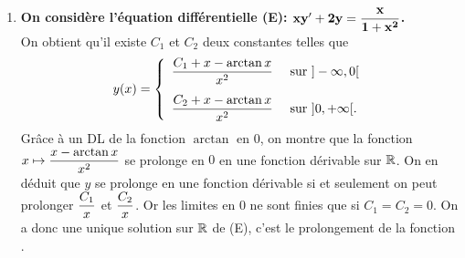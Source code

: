 \documentclass[a4paper, 11pt,reqno]{article}
\begin{document}
\begin{correction}
\begin{enumerate}
\item \textbf{On consid\`ere l'\'equation diff\'erentielle (E): $\mathbf{xy^{\prime}+2y=\displaystyle\frac{x}{1+x^2}}$.} \\
On obtient qu'il existe $C_1$ et $C_2$ deux constantes telles que
$$y(x) = \left\{ \begin{array}{rl}
\ddp \frac{C_1+x-\arctan x}{x^2} & \textmd{ sur } ]-\infty,0[\vsec\\
\ddp \frac{C_2+x-\arctan x}{x^2} & \textmd{ sur } ]0,+\infty[.
\end{array} \right.$$
Gr\^ace \`a un DL de la fonction $\arctan$ en $0$, on montre que la fonction $x\mapsto \displaystyle \frac{x-\arctan x}{x^2} $ se prolonge en $0$ en une fonction d\'erivable sur $\mathbb{R}$. On en d\'eduit que $y$ se prolonge en une fonction d\'erivable si et seulement on peut prolonger $\displaystyle \frac{C_1}{x}$ et $\displaystyle \frac{C_2}{x}$. Or les limites en $0$ ne sont finies que si $C_1=C_2=0$. On a donc une unique solution sur $\mathbb{R}$ de (E), c'est le prolongement de la fonction .
\end{enumerate}
\end{correction}
\end{document}
